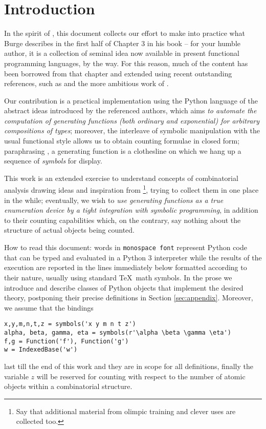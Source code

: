 
\section{Introduction}

In the spirit of \citet{burge1975recursive}, this document collects our effort
to make into practice what Burge describes in the first half of Chapter $3$ in
his book -- for your humble author, it is a collection of seminal idea now
available in present functional programming languages, by the way. For this
reason, much of the content has been borrowed from that chapter and extended
using recent outstanding references, such as \citet{sedgewick2014introduction}
and the more ambitious work of \citet{flajolet2009analytic}.

Our contribution is a practical implementation using the Python language of the
abstract ideas introduced by the referenced authors, which aims \emph{to
automate the computation of generating functions (both ordinary and
exponential) for arbitrary compositions of types}; moreover, the interleave of
symbolic manipulation with the usual functional style allows us to obtain
counting formulae in closed form; paraphrasing \citet{Wilf:2006:GEN:1204575}, a
generating function is a clothesline on which we hang up a sequence of
\textit{symbols} for display.

This work is an extended exercise to understand concepts of combinatorial
analysis drawing ideas and inspiration from \citet{riordan2002introduction}
\footnote{Say that additional material from olimpic training and clever uses
are collected too.}, trying to collect them in one place in the while;
eventually, we wish to \textit{use generating functions as a true enumeration
device by a tight integration with symbolic programming}, in addition to their
counting capabilities which, on the contrary, say nothing about the structure
of actual objects being counted.

How to read this document: words in \texttt{monospace font} represent Python
code that can be typed and evaluated in a Python 3 interpreter while the
results of the execution are reported in the lines immediately below formatted
according to their nature, usually using standard \TeX\, math symbols. In the
prose we introduce and describe classes of Python objects that implement the
desired theory, postponing their precise definitions in Section
\ref{sec:appendix}. Moreover, we assume that the bindings
\begin{verbatim}
x,y,m,n,t,z = symbols('x y m n t z')
alpha, beta, gamma, eta = symbols(r'\alpha \beta \gamma \eta')
f,g = Function('f'), Function('g')
w = IndexedBase('w')
\end{verbatim}
last till the end of this work and they are in scope for all definitions, finally
the variable $z$ will be reserved for counting with respect to the number of
atomic objects within a combinatorial structure.

